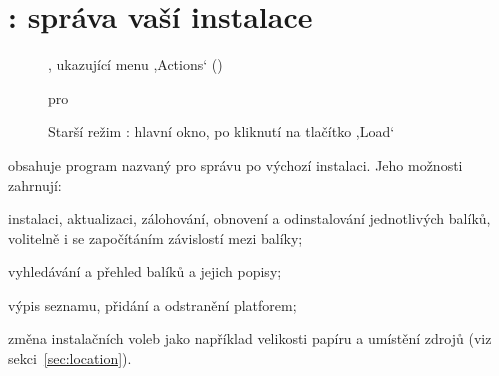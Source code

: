\documentclass[\classoptions,slovak,english,czech]{\classname}
\newcommand{\singleuv}[1]{,#1`}
\begin{document}
%
%
%

\section{: správa vaší instalace}
\label{sec:tlmgr}

\begin{figure}[tb]
	\caption{ \GUI, ukazující menu \singleuv{Actions} (\MacOSX)}
	\label{fig:tlshell}
\end{figure}

\begin{figure}[tb]
	\caption{ \GUI{} pro }
	\label{fig:tlcockpit}
\end{figure}

\begin{figure}[tb]
	\caption{Starší režim  \GUI: hlavní okno, po kliknutí na tlačítko \singleuv{Load}}
	\label{fig:tlmgr-gui}
\end{figure}

\TL{} obsahuje program nazvaný  pro správu \TL{}
po výchozí instalaci. Jeho možnosti zahrnují:
\begin{itemize*}
\item instalaci, aktualizaci, zálohování, obnovení a odinstalování 
jednotlivých balíků, volitelně i se započítáním závislostí mezi
balíky; %
\item vyhledávání a přehled balíků a jejich popisy;
\item výpis seznamu, přidání a odstranění platforem;
\item změna instalačních voleb jako například velikosti papíru a umístění 
zdrojů (viz sekci~\ref{sec:location}).
\end{itemize*}
\end{document}
